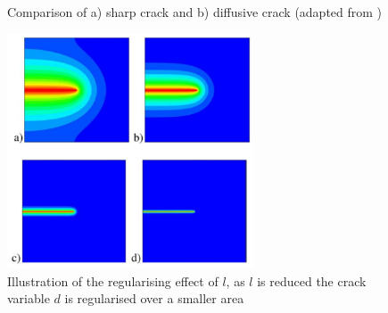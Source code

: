 \documentclass[sn-mathphys,Numbered,draft]{sn-jnl}%
\begin{document}
 \begin{figure}[t!]
	\centering
	  \qquad
\caption{Comparison of a) sharp crack and b) diffusive crack (adapted from \cite{borden_phase-field_2016})}
	\label{fig:diffusedSharpCrack}
\end{figure}
\FloatBarrier

\begin{figure}[htb]
\begin{center}
	\includegraphics[width=0.65\textwidth]{./Figures/damageModels/effectsofl.png}
\caption{Illustration of the regularising effect of $l$, as $l$ is reduced the crack variable $d$ is regularised over a smaller area}
\label{fig:Regularising effects of l}
\end{center}
\end{figure}
\FloatBarrier
\end{document}
